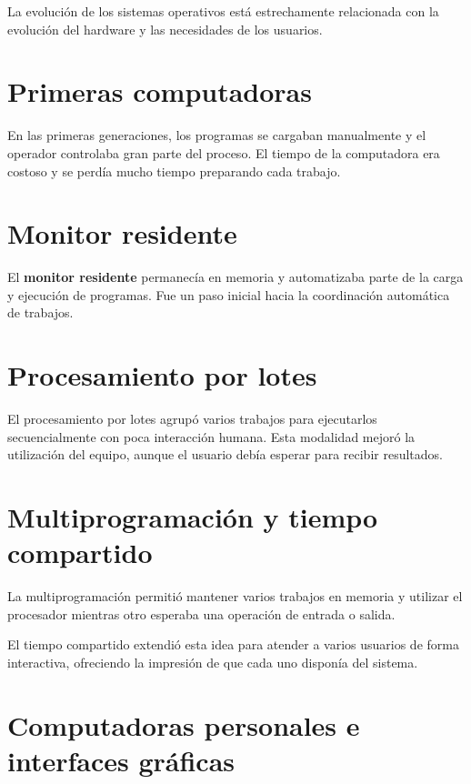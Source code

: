 \documentclass[
  spanish,
  letterpaper,
]{scrbook}
\begin{document}
La evolución de los sistemas operativos está estrechamente relacionada
con la evolución del hardware y las necesidades de los usuarios.

\section{Primeras computadoras}\label{primeras-computadoras}

En las primeras generaciones, los programas se cargaban manualmente y el
operador controlaba gran parte del proceso. El tiempo de la computadora
era costoso y se perdía mucho tiempo preparando cada trabajo.

\section{Monitor residente}\label{monitor-residente}

El \textbf{monitor residente} permanecía en memoria y automatizaba parte
de la carga y ejecución de programas. Fue un paso inicial hacia la
coordinación automática de trabajos.

\section{Procesamiento por lotes}\label{procesamiento-por-lotes}

El procesamiento por lotes agrupó varios trabajos para ejecutarlos
secuencialmente con poca interacción humana. Esta modalidad mejoró la
utilización del equipo, aunque el usuario debía esperar para recibir
resultados.

\section{Multiprogramación y tiempo
compartido}\label{multiprogramaciuxf3n-y-tiempo-compartido}

La multiprogramación permitió mantener varios trabajos en memoria y
utilizar el procesador mientras otro esperaba una operación de entrada o
salida.

El tiempo compartido extendió esta idea para atender a varios usuarios
de forma interactiva, ofreciendo la impresión de que cada uno disponía
del sistema.

\section{Computadoras personales e interfaces
gráficas}\label{computadoras-personales-e-interfaces-gruxe1ficas}
\end{document}
